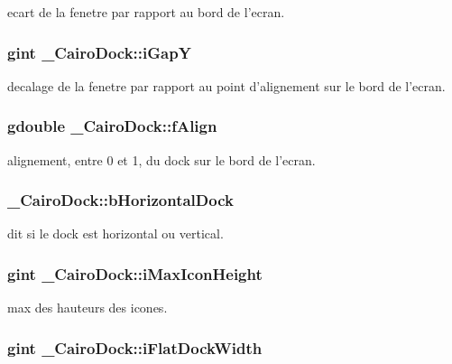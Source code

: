 ecart de la fenetre par rapport au bord de l'ecran. 

\subsubsection{\setlength{\rightskip}{0pt plus 5cm}gint {\bf \_\-CairoDock::iGapY}}\label{struct__CairoDock_744083c6364282178069eae84f63f4e2}


decalage de la fenetre par rapport au point d'alignement sur le bord de l'ecran. 

\subsubsection{\setlength{\rightskip}{0pt plus 5cm}gdouble {\bf \_\-CairoDock::fAlign}}\label{struct__CairoDock_b57e22909edfc5389d77da68d687c429}


alignement, entre 0 et 1, du dock sur le bord de l'ecran. 

\subsubsection{ {\bf \_\-CairoDock::bHorizontalDock}}\label{struct__CairoDock_290f1d413855290cad575617e02a57bb}


dit si le dock est horizontal ou vertical. 

\subsubsection{\setlength{\rightskip}{0pt plus 5cm}gint {\bf \_\-CairoDock::iMaxIconHeight}}\label{struct__CairoDock_e6d48ba72a3f91a0d03fe19759761520}


max des hauteurs des icones. 

\subsubsection{\setlength{\rightskip}{0pt plus 5cm}gint {\bf \_\-CairoDock::iFlatDockWidth}}\label{struct__CairoDock_02f52b22351af6dc76e31092e5ae6256}


